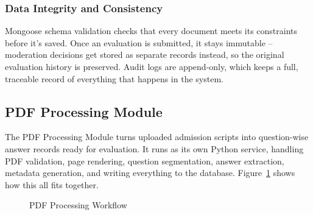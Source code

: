 \subsubsection{Data Integrity and Consistency}

Mongoose schema validation checks that every document meets its constraints before it's saved. Once an evaluation is submitted, it stays immutable -- moderation decisions get stored as separate records instead, so the original evaluation history is preserved. Audit logs are append-only, which keeps a full, traceable record of everything that happens in the system.

\subsection{PDF Processing Module}

The PDF Processing Module turns uploaded admission scripts into question-wise answer records ready for evaluation. It runs as its own Python service, handling PDF validation, page rendering, question segmentation, answer extraction, metadata generation, and writing everything to the database. Figure~\ref{fig:pdf_workflow} shows how this all fits together.

\begin{figure}[ht]
\centering


\caption{PDF Processing Workflow}
\label{fig:pdf_workflow}

\end{figure}

